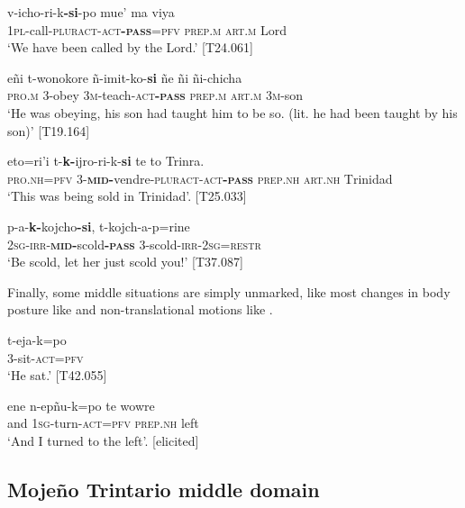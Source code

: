 \documentclass[output=paper]{langscibook}
\begin{document}
\ea
\label{ex:Rose:59}
\gll v-icho-ri-k\textbf{-si}-po mue' ma viya\\
1\textsc{pl}-call-\textsc{pluract-act\textbf{-pass}=pfv} \textsc{prep.m} \textsc{art.m} Lord\\
\glt ‘We have been called by the Lord.’ [T24.061]
\z

\ea
\label{ex:Rose:60}
\gll eñi t-wonokore ñ-imit-ko-\textbf{si} ñe ñi ñi-chicha\\
\textsc{pro}.\textsc{m} 3-obey 3\textsc{m}-teach-\textsc{act}\textbf{-}\textbf{\textsc{pass}} \textsc{prep}.\textsc{m} \textsc{art}.\textsc{m} 3\textsc{m}-son\\
\glt ‘He was obeying, his son had taught him to be so. (lit. he had been taught by his son)’ [T19.164]
\z

\ea
\label{ex:Rose:61}
\gll eto=ri'i t-\textbf{k-}ijro-ri-k-\textbf{si} te to Trinra.\\
\textsc{pro}.\textsc{nh}=\textsc{pfv} 3-\textbf{\textsc{mid}}\textbf{-}vendre-\textsc{pluract}-\textsc{act}\textbf{-}\textbf{\textsc{pass}} \textsc{prep.nh} \textsc{art}.\textsc{nh} \textsc{T}rinidad\\
\glt ‘This was being sold in Trinidad’. [T25.033]
\z

\ea
\label{ex:Rose:62}
\gll p-a-\textbf{k-}kojcho\textbf{-si}, t-kojch-a-p=rine\\
\textsc{2sg-irr-\textbf{mid}}\textbf{-}scold\textbf{-}\textsc{\textbf{pass}} 3-scold-\textsc{irr-2sg=restr}\\
\glt ‘Be scold, let her just scold you!’ [T37.087]
\z


Finally, some middle situations are simply unmarked, like most changes in body posture like  and non-translational motions like .


\ea
\label{ex:Rose:63}
\gll t-eja-k=po\\
3-sit-\textsc{act=pfv}\\
\glt ‘He sat.’ [T42.055]
\z

\ea
\label{ex:Rose:64}
\gll ene n-epñu-k=po te wowre\\
and 1\textsc{sg}-turn-\textsc{act=pfv} \textsc{prep.nh} left\\
\glt ‘And I turned to the left’. [elicited]
\z

\subsection{Mojeño Trintario middle domain}
\label{sec:Rose:6.2}
\end{document}

